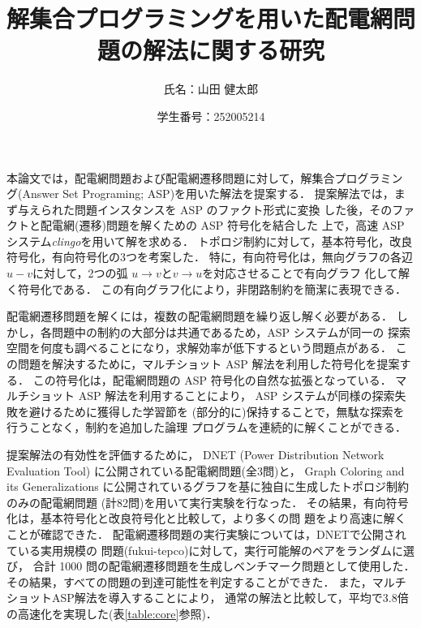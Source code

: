 \documentclass[dvipdfmx,a4paper]{jsarticle}
\title{\vspace{-3cm}解集合プログラミングを用いた配電網問題の解法に関する研究}
\author{氏名：山田 健太郎}
\date{学生番号：252005214}
\begin{document}
\maketitle


本論文では，配電網問題および配電網遷移問題に対して，解集合プログラミン
グ(Answer Set Programing; ASP)を用いた解法を提案する．
提案解法では，まず与えられた問題インスタンスを ASP のファクト形式に変換
した後，そのファクトと配電網(遷移)問題を解くための ASP 符号化を結合した
上で，高速 ASP システム\textit{clingo}を用いて解を求める．
トポロジ制約に対して，基本符号化，改良符号化，有向符号化の3つを考案した．
特に，有向符号化は，無向グラフの各辺$u-v$に対して，2つの弧
$u\rightarrow v$と$v\rightarrow u$を対応させることで有向グラフ
化して解く符号化である．
この有向グラフ化により，非閉路制約を簡潔に表現できる．

配電網遷移問題を解くには，複数の配電網問題を繰り返し解く必要がある．
しかし，各問題中の制約の大部分は共通であるため，ASP システムが同一の
探索空間を何度も調べることになり，求解効率が低下するという問題点がある．
この問題を解決するために，マルチショット ASP 解法を利用した符号化を提案する．
この符号化は，配電網問題の ASP 符号化の自然な拡張となっている．
マルチショット ASP 解法を利用することにより，
ASP システムが同様の探索失敗を避けるために獲得した学習節を
(部分的に)保持することで，無駄な探索を行うことなく，制約を追加した論理
プログラムを連続的に解くことができる．

提案解法の有効性を評価するために，
DNET (Power Distribution Network Evaluation Tool)
に公開されている配電網問題(全3問)と，
Graph Coloring and its Generalizations
に公開されているグラフを基に独自に生成したトポロジ制約のみの配電網問題
(計82問)を用いて実行実験を行なった．
その結果，有向符号化は，基本符号化と改良符号化と比較して，より多くの問
題をより高速に解くことが確認できた．
%
配電網遷移問題の実行実験については，DNETで公開されている実用規模の
問題({\sf fukui-tepco})に対して，実行可能解のペアをランダムに選び，
合計 1000 問の配電網遷移問題を生成しベンチマーク問題として使用した．
その結果，すべての問題の到達可能性を判定することができた．
また，マルチショットASP解法を導入することにより，
通常の解法と比較して，平均で3.8倍の高速化を実現した(表\ref{table:core}参照)．
\end{document}
